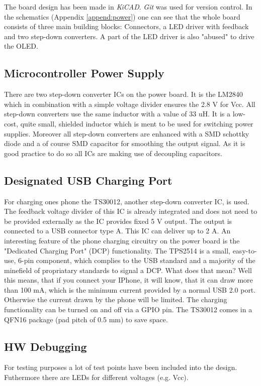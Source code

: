 The board design has been made in \textit{KiCAD}. \textit{Git} was used for version control. In the schematics (Appendix \ref{append:power}) one can see that the whole board consists of three main building blocks: Connectors, a LED driver with feedback and two step-down converters. A part of the LED driver is also "abused" to drive the OLED. 
\subsection{Microcontroller Power Supply}
There are two step-down converter ICs on the power board. It is the LM2840 which in combination with a simple voltage divider ensures the 2.8 V for Vcc. All step-down converters use the same inductor with a value of 33 uH. It is a low-cost, quite small, shielded inductor which is ment to be used for switching power supplies. Moreover all step-down converters are enhanced with a SMD schottky diode and a of course SMD capacitor for smoothing the output signal. As it is good practice to do so all ICs are making use of decoupling capacitors. 
\subsection{Designated USB Charging Port}
For charging ones phone the TS30012, another step-down converter IC, is used. The feedback voltage divider of this IC is already integrated and does not need to be provided externally as the IC provides fixed 5 V output. The output is connected to a USB connector type A. This IC can deliver up to 2 A. An interesting feature of the phone charging circuitry on the power board is the "Dedicated Charging Port" (DCP) functionality. The TPS2514 is a small, easy-to-use, 6-pin component, which complies to the USB standard and a majority of the minefield of propriatary standards to signal a DCP. What does that mean? Well this means, that if you connect your IPhone, it will know, that it can draw more than 100 mA, which is the minimum current provided by a normal USB 2.0 port. Otherwise the current drawn by the phone will be limited. The charging functionality can be turned on and off via a GPIO pin. The TS30012 comes in a QFN16 package (pad pitch of 0.5 mm) to save space.   
\subsection{HW Debugging}
For testing purposes a lot of test points have been included into the design. Futhermore there are LEDs for different voltages (e.g. Vcc).
